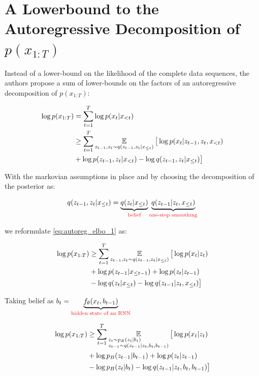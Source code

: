 \documentclass[10pt,twocolumn,letterpaper]{article}
\begin{document}
	\section{A Lowerbound to the Autoregressive Decomposition of $p(x_{1:T})$}
	
	Instead of a lower-bound on the likelihood of the complete data sequences, the authors propose a sum of lower-bounds on the factors of an autoregressive decomposition of $p(x_{1:T})$:
	
	\begin{equation}\label{eq:autoreg_elbo_1}
	\begin{split}
	\log p(x_{1:T}) &= \sum_{t=1}^{T} \log p(x_t|x_{<t}) \\
	&\geq \sum_{t=1}^{T} \operatorname*{\mathbb{E}}_{z_{t-1}, z_t \sim q(z_{t-1}, z_t| x_{\leq t})} \big[\log p(x_t|z_{t-1}, z_t, x_{<t}) \\&+ \log p(z_{t-1}, z_t| x_{<t})
- \log q(z_{t-1}, z_t| x_{\leq t})\big]
	\end{split}
	\end{equation}
	
	With the markovian assumptions in place and by choosing the decomposition of the posterior as:
	
	\begin{equation}
	q(z_{t-1}, z_t| x_{\leq t}) = \underbrace{q(z_t| x_{\leq t})}_{\text{\color{red} belief}} \underbrace{q(z_{t-1}| z_t, x_{\leq t})}_{\text{\color{red} one-step smoothing}}
	\end{equation}
	
	we reformulate \ref{eq:autoreg_elbo_1} as:
	
	\begin{equation}\label{eq:autoreg_elbo_2}
	\begin{split}
	\log p(x_{1:T}) 
	&\geq \sum_{t=1}^{T} \operatorname*{\mathbb{E}}_{z_{t-1}, z_t \sim q(z_{t-1}, z_t| x_{\leq t})} \big[\log p(x_t|z_t) 
	\\&+ \log p(z_{t-1}| x_{\leq t-1})
+ \log p(z_t| z_{t-1}) \\&- \log q(z_t| x_{\leq t}) - \log q(z_{t-1}| z_t, x_{\leq t})\big]
	\end{split}
	\end{equation}
	
	Taking belief as $b_t = \underbrace{f_\theta(x_t, b_{t-1})}_{\color{red} \text{hidden state of an RNN}}$
	
	\begin{equation}\label{eq:autoreg_elbo_3}
	\begin{split}
	\log p(x_{1:T}) 
	&\geq \sum_{t=1}^{T} \E_{\begin{subarray}
		\centering
		z_t \sim p_B(z_t| b_{t}) \\
		z_{t-1} \sim q(z_{t-1}| z_t, b_t, b_{t-1})
		\end{subarray}} \big[\log p(x_t|z_t) 
	\\&+ \log p_B(z_{t-1}| b_{t-1})
+ \log p(z_t| z_{t-1}) \\&- \log p_B(z_t| b_{t}) - \log q(z_{t-1}| z_t, b_t, b_{t-1})\big]
	\end{split}
	\end{equation}
	
\end{document}
